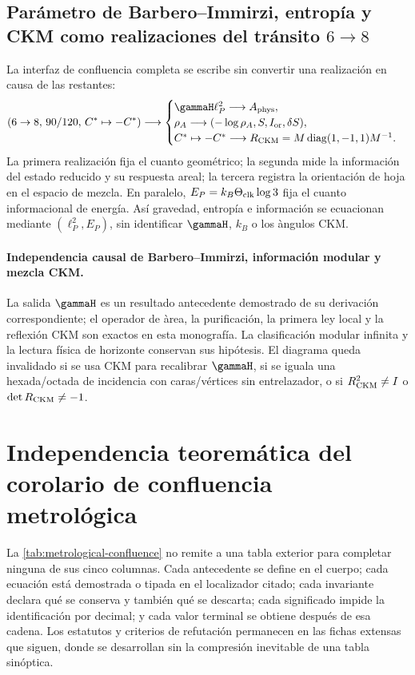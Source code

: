 \subsection{Par\'ametro de Barbero--Immirzi, entrop\'ia y CKM como realizaciones del tr\'ansito \(6\to8\)}

La interfaz de confluencia completa se escribe sin convertir una
realizaci\'on en causa de las restantes:
\begin{equation}
(6\to8,\,90/120,\,C^*\mapsto-C^*)\longrightarrow
\begin{cases}
\gammaH\ell_P^2\longrightarrow A_{\rm phys},\\
\rho_A\longrightarrow(-\log\rho_A,S,I_{\rm or},\delta S),\\
C^*\mapsto-C^*\longrightarrow
R_{\rm CKM}=M\operatorname{diag}(1,-1,1)M^{-1}.
\end{cases}
\label{eq:atlas-bic-entropy-ckm}
\end{equation}
La primera realizaci\'on fija el cuanto geom\'etrico; la segunda mide la
informaci\'on del estado reducido y su respuesta areal; la tercera registra la
orientaci\'on de hoja en
el espacio de mezcla. En paralelo,
\(E_P=k_B\Theta_{\rm clk}\log3\) fija el cuanto informacional de energ\'ia.
As\'i gravedad, entrop\'ia e informaci\'on se ecuacionan mediante
\((\ell_P^2,E_P)\), sin identificar \(\gammaH\), \(k_B\) o los \`angulos CKM.

\paragraph{Independencia causal de Barbero--Immirzi, información modular y mezcla CKM.}
La salida \(\gammaH\) es un resultado antecedente demostrado de su derivación correspondiente; el
operador de \`area, la purificaci\'on, la primera ley local y la reflexi\'on CKM
son exactos en esta monograf\'ia. La clasificaci\'on modular infinita y la lectura
f\'isica de horizonte conservan sus hip\'otesis. El diagrama queda invalidado si
se usa CKM para recalibrar \(\gammaH\), si se iguala una hexada/octada de
incidencia con caras/v\'ertices sin entrelazador, o si
\(R_{\rm CKM}^2\ne I\) o \(\det R_{\rm CKM}\ne-1\).

\section{Independencia teoremática del corolario de confluencia metrológica}

La \cref{tab:metrological-confluence} no remite a una tabla exterior para
completar ninguna de sus cinco columnas. Cada antecedente se define en el
cuerpo; cada ecuaci\'on est\'a demostrada o tipada en el localizador citado;
cada invariante declara qu\'e se conserva y tambi\'en qu\'e se descarta; cada
significado impide la identificaci\'on por decimal; y cada valor terminal se
obtiene despu\'es de esa cadena. Los estatutos y criterios de refutación permanecen en las
fichas extensas que siguen, donde se desarrollan sin la compresi\'on inevitable
de una tabla sin\'optica.

